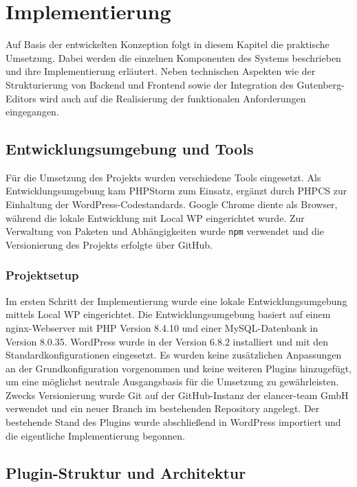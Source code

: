 \chapter{Implementierung}
\label{chap:implementation}

Auf Basis der entwickelten Konzeption folgt in diesem Kapitel die praktische Umsetzung.
Dabei werden die einzelnen Komponenten des Systems beschrieben und ihre Implementierung erläutert.
Neben technischen Aspekten wie der Strukturierung von Backend und Frontend sowie der Integration des Gutenberg-Editors wird auch auf die Realisierung der funktionalen Anforderungen eingegangen.

\section{Entwicklungsumgebung und Tools}

Für die Umsetzung des Projekts wurden verschiedene Tools eingesetzt.
Als Entwicklungsumgebung kam PHPStorm zum Einsatz, ergänzt durch PHPCS zur Einhaltung der WordPress-Codestandards.
Google Chrome diente als Browser, während die lokale Entwicklung mit Local WP eingerichtet wurde.
Zur Verwaltung von Paketen und Abhängigkeiten wurde \texttt{npm} verwendet und die Versionierung des Projekts erfolgte über GitHub.

\subsection{Projektsetup}

Im ersten Schritt der Implementierung wurde eine lokale Entwicklungsumgebung mittels Local WP eingerichtet.
Die Entwicklungsumgebung basiert auf einem nginx-Webserver mit PHP Version 8.4.10 und einer MySQL-Datenbank in Version 8.0.35.
WordPress wurde in der Version 6.8.2 installiert und mit den Standardkonfigurationen eingesetzt.
Es wurden keine zusätzlichen Anpassungen an der Grundkonfiguration vorgenommen und keine weiteren Plugins hinzugefügt, um eine möglichst neutrale Ausgangsbasis für die Umsetzung zu gewährleisten.
Zwecks Versionierung wurde Git auf der GitHub-Instanz der elancer-team GmbH verwendet und ein neuer Branch im bestehenden Repository angelegt.
Der bestehende Stand des Plugins wurde abschließend in WordPress importiert und die eigentliche Implementierung begonnen.

\section{Plugin-Struktur und Architektur}

